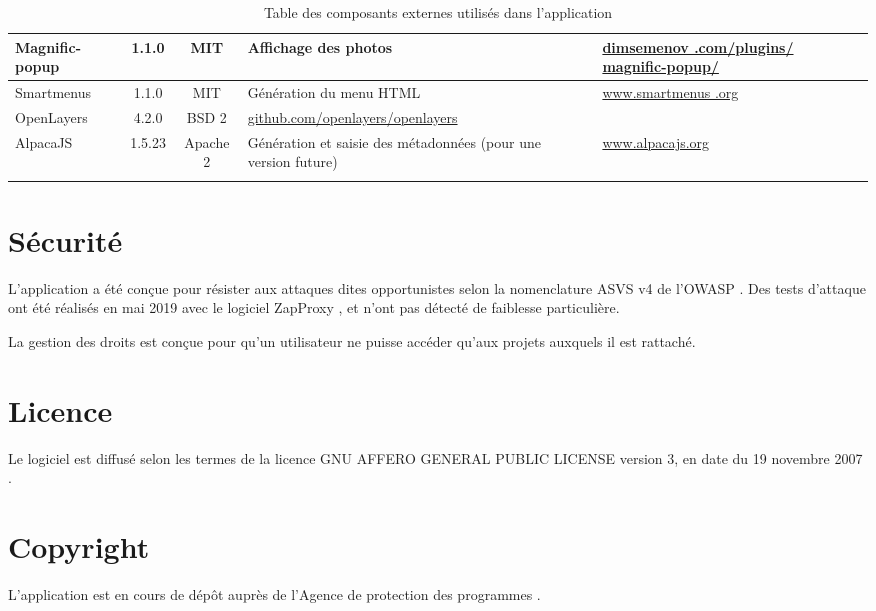 \begin{longtable}{|>{\raggedright\arraybackslash}p{3cm}|c|c|>{\raggedright\arraybackslash}p{3cm}|>{\raggedright\arraybackslash}p{3cm}|}
\hline 
Magnific-popup & 1.1.0 & MIT & Affichage des photos & \href{http://dimsemenov.com/plugins/magnific-popup/}{dimsemenov .com/plugins/ magnific-popup/}\\ 
\hline 
Smartmenus & 1.1.0 & MIT & Génération du menu HTML & \href{http://www.smartmenus .org}{www.smartmenus .org} \\ 
\hline 
OpenLayers & 4.2.0 & BSD 2 & \href{https://github.com/openlayers/openlayers}{github.com/openlayers/openlayers} \\
\hline
AlpacaJS & 1.5.23 & Apache 2 & Génération et saisie des métadonnées (pour une version future) & 
\href{http://www.alpacajs.org/}{www.alpacajs.org}\\
\hline
\caption{Table des composants externes utilisés dans l'application}
\end{longtable} 

\section{Sécurité}

L'application a été conçue pour résister aux attaques dites opportunistes selon la nomenclature ASVS v4 \cite{asvs} de l'OWASP \cite{owasp}. Des tests d'attaque ont été réalisés en mai 2019 avec le logiciel ZapProxy \cite{zaproxy}, et n'ont pas détecté de faiblesse particulière.

La gestion des droits est conçue pour qu'un utilisateur ne puisse accéder qu'aux projets auxquels il est rattaché. 

\section{Licence}
Le logiciel est diffusé selon les termes de la licence GNU AFFERO GENERAL PUBLIC LICENSE version 3, en date du 19 novembre 2007 \cite{agpl}.

\section{Copyright}

L'application est en cours de dépôt auprès de l'Agence de protection des programmes \cite{app}.
